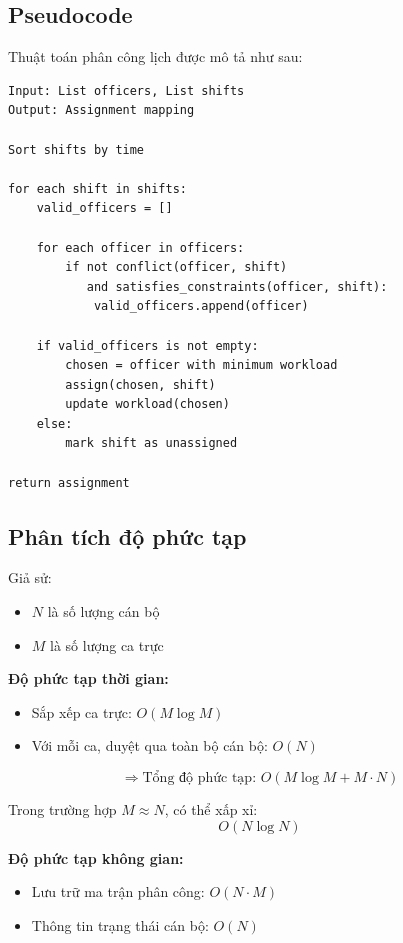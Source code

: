 \documentclass[18pt,a4paper]{report}
\begin{document}
\subsection{Pseudocode}
Thuật toán phân công lịch được mô tả như sau:

\begin{verbatim}
Input: List officers, List shifts
Output: Assignment mapping

Sort shifts by time

for each shift in shifts:
    valid_officers = []

    for each officer in officers:
        if not conflict(officer, shift) 
           and satisfies_constraints(officer, shift):
            valid_officers.append(officer)

    if valid_officers is not empty:
        chosen = officer with minimum workload
        assign(chosen, shift)
        update workload(chosen)
    else:
        mark shift as unassigned

return assignment
\end{verbatim}

\subsection{Phân tích độ phức tạp}
Giả sử:
\begin{itemize}[leftmargin=1.2cm]
    \item $N$ là số lượng cán bộ
    \item $M$ là số lượng ca trực
\end{itemize}

\textbf{Độ phức tạp thời gian:}
\begin{itemize}[leftmargin=1.2cm]
    \item Sắp xếp ca trực: $O(M \log M)$
    \item Với mỗi ca, duyệt qua toàn bộ cán bộ: $O(N)$
\end{itemize}

\[
\Rightarrow \text{Tổng độ phức tạp: } O(M \log M + M \cdot N)
\]

Trong trường hợp $M \approx N$, có thể xấp xỉ:
\[
O(N \log N)
\]

\textbf{Độ phức tạp không gian:}
\begin{itemize}[leftmargin=1.2cm]
    \item Lưu trữ ma trận phân công: $O(N \cdot M)$
    \item Thông tin trạng thái cán bộ: $O(N)$
\end{itemize}
\end{document}
